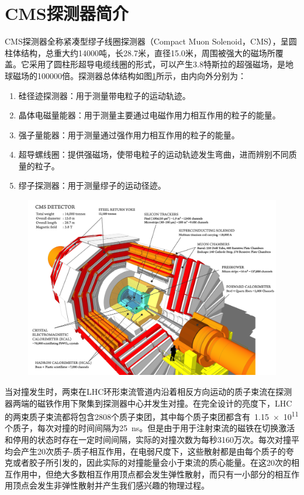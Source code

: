 \section{CMS探测器简介}

CMS探测器全称紧凑型缪子线圈探测器（Compact Muon Solenoid，CMS），呈圆柱体结构，总重大约14000吨，长28.7米，直径15.0米，周围被强大的磁场所覆盖。它采用了圆柱形超导电缆线圈的形式，可以产生3.8特斯拉的超强磁场，是地球磁场的100000倍。探测器总体结构如图\ref{fig:c02f03}所示，由内向外分别为：

\begin{enumerate}
    \item 硅径迹探测器：用于测量带电粒子的运动轨迹。
    \item 晶体电磁量能器：用于测量主要通过电磁作用力相互作用的粒子的能量。
    \item 强子量能器：用于测量通过强作用力相互作用的粒子的能量。
    \item 超导螺线圈：提供强磁场，使带电粒子的运动轨迹发生弯曲，进而辨别不同质量的粒子。
    \item 缪子探测器：用于测量缪子的运动径迹。
\end{enumerate}

\begin{figure}[!htbp]
    \centering
    \includegraphics[width=1.0\textwidth]{figures/chapter02/CMS_160312_06.png}
    \label{fig:c02f03}
\end{figure}

当对撞发生时，两束在LHC环形束流管道内沿着相反方向运动的质子束流在探测器两端的磁铁作用下聚集到探测器中心并发生对撞。在完全设计的亮度下，LHC的两束质子束流都将包含2808个质子束团，其中每个质子束团都含有~\num{1.15e11}个质子，每次对撞的时间间隔为25~\si{\nano\second}。但是由于用于注射束流的磁铁在切换激活和停用的状态时存在一定时间间隔，实际的对撞次数为每秒3160万次。每次对撞平均会产生20次质子-质子相互作用，在电弱尺度下，这些散射都是由每个质子的夸克或者胶子所引发的，因此实际的对撞能量会小于束流的质心能量。在这20次的相互作用中，但绝大多数相互作用顶点都会发生弹性散射，而只有一小部分的相互作用顶点会发生非弹性散射并产生我们感兴趣的物理过程。

